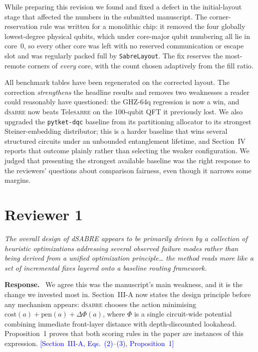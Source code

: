 \documentclass[11pt]{article}
\newcommand{\dSABRE}{d\textsc{sabre}}
\newcommand{\TeleSABRE}{Tele\textsc{sabre}}
\newenvironment{comment}{\medskip\noindent\itshape}{\par}
\newcommand{\response}{\smallskip\noindent\textbf{Response.}\ }
\newcommand{\where}[1]{\textcolor{blue}{[#1]}}
\begin{document}
While preparing this revision we found and fixed a defect in the
initial-layout stage that affected the numbers in the submitted
manuscript.  The corner-reservation rule was written for a monolithic
chip: it removed the four globally lowest-degree physical qubits, which
under core-major qubit numbering all lie in core~0, so every other core
was left with no reserved communication or escape slot and was
regularly packed full by \texttt{SabreLayout}.  The fix reserves the
most-remote corners of \emph{every} core, with the count chosen
adaptively from the fill ratio.

All benchmark tables have been regenerated on the corrected layout.
The correction \emph{strengthens} the headline results and removes two
weaknesses a reader could reasonably have questioned: the GHZ-64q
regression is now a win, and \dSABRE{} now beats \TeleSABRE{} on the
100-qubit QFT it previously lost.  We also upgraded the
\texttt{pytket-dqc} baseline from its partitioning allocator to its
strongest Steiner-embedding distributor; this is a harder baseline that
wins several structured circuits under an unbounded entanglement
lifetime, and Section~IV reports that outcome plainly rather than
selecting the weaker configuration.  We judged that presenting the
strongest available baseline was the right response to the reviewers'
questions about comparison fairness, even though it narrows some
margins.

\section*{Reviewer 1}

\begin{comment}
The overall design of dSABRE appears to be primarily driven by a
collection of heuristic optimizations addressing several observed
failure modes rather than being derived from a unified optimization
principle\ldots{} the method reads more like a set of incremental fixes
layered onto a baseline routing framework.
\end{comment}

\response
We agree this was the manuscript's main weakness, and it is the change
we invested most in.  Section~III-A now states the design principle
before any mechanism appears: \dSABRE{} chooses the action minimising
$\mathrm{cost}(a) + \mathrm{pen}(a) + \Delta\Phi(a)$, where $\Phi$ is a
single circuit-wide potential combining immediate front-layer distance
with depth-discounted lookahead.  Proposition~1 proves that both
scoring rules in the paper are instances of this expression.
\where{Section~III-A, Eqs.~(2)--(3), Proposition~1}
\end{document}
